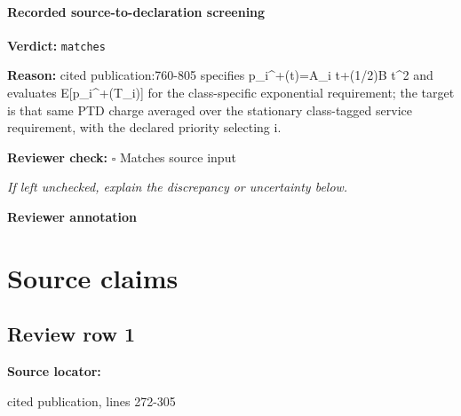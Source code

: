 \documentclass[10pt]{article}
\newcommand{\reviewerbox}{%
  \par\noindent\fbox{\parbox{0.96\linewidth}{\rule{0pt}{0.38in}}}\par
}
\newcommand{\reviewmatch}[1]{%
  \par\noindent\textbf{Reviewer check:} $\square$\; #1\par
  \noindent\emph{If left unchecked, explain the discrepancy or uncertainty below.}\par
}
\begin{document}
\paragraph{Recorded source-to-declaration screening}
\textbf{Verdict:} \texttt{matches}
\\
{\raggedright
\textbf{Reason:} cited publication:\allowbreak{}760-\allowbreak{}805 specifies p\_\allowbreak{}i\textasciicircum{}+(t)=A\_\allowbreak{}i t+(1/\allowbreak{}2)B t\textasciicircum{}2 and evaluates E[p\_\allowbreak{}i\textasciicircum{}+(T\_\allowbreak{}i)] for the class-\allowbreak{}specific exponential requirement;\allowbreak{} the target is that same PTD charge averaged over the stationary class-\allowbreak{}tagged service requirement, with the declared priority selecting i.\allowbreak{}
\par}
\reviewmatch{Matches source input}
\noindent\textbf{Reviewer annotation}\par
\reviewerbox

\clearpage
\hypertarget{source-claim-0d52797e81514cb8}{}
\hypertarget{source-section-f10b5f68e4acf3dc}{}
\section*{Source claims}
\subsection*{Review row 1}
\textbf{Source locator:} {\footnotesize\raggedright cited publication, lines 272-\allowbreak{}305\par}
\end{document}
